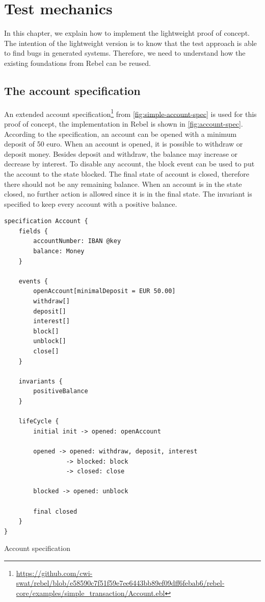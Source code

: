 \chapter{Test mechanics}\label{sec:ch3}

In this chapter, we explain how to implement the lightweight proof of concept. The intention of the lightweight version is to know that the test approach is able to find bugs in generated systems. Therefore, we need to understand how the existing foundations from Rebel can be reused.


\section{The account specification}
An extended account specification\footnote{\url{https://github.com/cwi-swat/rebel/blob/e58590c7f51f59e7ee6443bb89ef09dff6febab6/rebel-core/examples/simple_transaction/Account.ebl}} from \autoref{fig:simple-account-spec} is used for this proof of concept, the implementation in Rebel is shown in \autoref{fig:account-spec}. According to the specification, an account can be opened with a minimum deposit of 50 euro. When an account is opened, it is possible to withdraw or deposit money. Besides deposit and withdraw, the balance may increase or decrease by interest. To disable any account, the block event can be used to put the account to the state blocked. The final state of account is closed, therefore there should not be any remaining balance. When an account is in the state closed, no further action is allowed since it is in the final state. The invariant is specified to keep every account with a positive balance.


\begin{sourcecode}[h!]
\begin{lstlisting}[]
specification Account {
	fields {
		accountNumber: IBAN @key
		balance: Money
	}

	events {
		openAccount[minimalDeposit = EUR 50.00]
		withdraw[]
		deposit[]
		interest[]
		block[]
		unblock[]
		close[]
	}

	invariants {
		positiveBalance
	}

	lifeCycle {
		initial init -> opened: openAccount

		opened -> opened: withdraw, deposit, interest
			     -> blocked: block
			     -> closed: close

		blocked -> opened: unblock

		final closed
	}
}
\end{lstlisting}
\caption{Account specification}\label{fig:account-spec}
\end{sourcecode}

